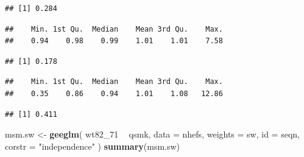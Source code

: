 \documentclass[
  10pt,
]{book}
\newenvironment{Shaded}{\begin{snugshade}}{\end{snugshade}}
\newcommand{\DataTypeTok}[1]{\textcolor[rgb]{0.13,0.29,0.53}{#1}}
\newcommand{\DecValTok}[1]{\textcolor[rgb]{0.00,0.00,0.81}{#1}}
\newcommand{\KeywordTok}[1]{\textcolor[rgb]{0.13,0.29,0.53}{\textbf{#1}}}
\newcommand{\NormalTok}[1]{#1}
\newcommand{\OperatorTok}[1]{\textcolor[rgb]{0.81,0.36,0.00}{\textbf{#1}}}
\newcommand{\StringTok}[1]{\textcolor[rgb]{0.31,0.60,0.02}{#1}}
\begin{document}
\begin{verbatim}
## [1] 0.284
\end{verbatim}

\begin{Shaded}
\end{Shaded}

\begin{verbatim}
##    Min. 1st Qu.  Median    Mean 3rd Qu.    Max. 
##    0.94    0.98    0.99    1.01    1.01    7.58
\end{verbatim}

\begin{Shaded}
\end{Shaded}

\begin{verbatim}
## [1] 0.178
\end{verbatim}

\begin{Shaded}
\end{Shaded}

\begin{verbatim}
##    Min. 1st Qu.  Median    Mean 3rd Qu.    Max. 
##    0.35    0.86    0.94    1.01    1.08   12.86
\end{verbatim}

\begin{Shaded}
\end{Shaded}

\begin{verbatim}
## [1] 0.411
\end{verbatim}

\begin{Shaded}
\begin{Highlighting}[]
\NormalTok{msm.sw <-}\StringTok{ }\KeywordTok{geeglm}\NormalTok{(}
\NormalTok{  wt82_}\DecValTok{71} \OperatorTok{~}\StringTok{ }\NormalTok{qsmk,}
  \DataTypeTok{data =}\NormalTok{ nhefs,}
  \DataTypeTok{weights =}\NormalTok{ sw,}
  \DataTypeTok{id =}\NormalTok{ seqn,}
  \DataTypeTok{corstr =} \StringTok{"independence"}
\NormalTok{)}
\KeywordTok{summary}\NormalTok{(msm.sw)}
\end{Highlighting}
\end{Shaded}
\end{document}
